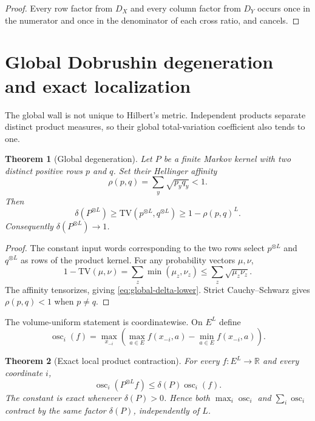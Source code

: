 \documentclass[11pt]{article}
\newtheorem{theorem}{Theorem}[section]
\newcommand{\TV}{\mathrm{TV}}
\newcommand{\osc}{\operatorname{osc}}
\newcommand{\R}{\mathbb{R}}
\newcommand{\1}{\mathbf{1}}
\begin{document}
\begin{proof}
Every row factor from $D_X$ and every column factor from $D_Y$ occurs once in
the numerator and once in the denominator of each cross ratio, and cancels.
\end{proof}

\section{Global Dobrushin degeneration and exact localization}

The global wall is not unique to Hilbert's metric.  Independent products
separate distinct product measures, so their global total-variation
coefficient also tends to one.

\begin{theorem}[Global degeneration]\label{thm:global-delta}
Let $P$ be a finite Markov kernel with two distinct positive rows $p$ and
$q$.  Set their Hellinger affinity
\[
 \rho(p,q)=\sum_y\sqrt{p_yq_y}<1.
\]
Then
\begin{equation}\label{eq:global-delta-lower}
 \delta(P^{\otimes L})
 \geq \TV(p^{\otimes L},q^{\otimes L})
 \geq 1-\rho(p,q)^L.
\end{equation}
Consequently $\delta(P^{\otimes L})\to1$.
\end{theorem}

\begin{proof}
The constant input words corresponding to the two rows select
$p^{\otimes L}$ and $q^{\otimes L}$ as rows of the product kernel.  For any
probability vectors $\mu,\nu$,
\[
 1-\TV(\mu,\nu)=\sum_z\min(\mu_z,\nu_z)
 \leq\sum_z\sqrt{\mu_z\nu_z}.
\]
The affinity tensorizes, giving \eqref{eq:global-delta-lower}.  Strict
Cauchy--Schwarz gives $\rho(p,q)<1$ when $p\ne q$.
\end{proof}

The volume-uniform statement is coordinatewise.  On $E^L$ define
\[
 \osc_i(f)=\max_{x_{-i}}\left(
       \max_{a\in E}f(x_{-i},a)-\min_{a\in E}f(x_{-i},a)
                         \right).
\]

\begin{theorem}[Exact local product contraction]\label{thm:local}
For every $f:E^L\to\R$ and every coordinate $i$,
\begin{equation}\label{eq:local-contraction}
 \osc_i(P^{\otimes L}f)\leq\delta(P)\osc_i(f).
\end{equation}
The constant is exact whenever $\delta(P)>0$.  Hence both
$\max_i\osc_i$ and $\sum_i\osc_i$ contract by the same factor $\delta(P)$,
independently of $L$.
\end{theorem}
\end{document}
